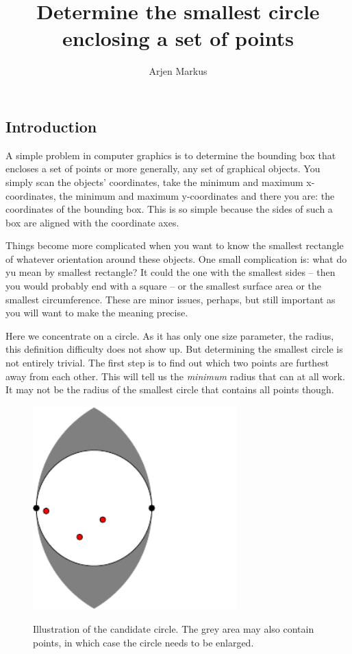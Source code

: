 \documentclass[onecolumn]{article}
\begin{document}
\title{Determine the smallest circle enclosing a set of points}

\author{Arjen Markus}

\maketitle


\subsection*{Introduction}

A simple problem in computer graphics is to determine the bounding box that encloses a set of points
or more generally, any set of graphical objects. You simply scan the objects' coordinates, take the minimum
and maximum x-coordinates, the minimum and maximum y-coordinates and there you are: the coordinates of the
bounding box. This is so simple because the sides of such a box are aligned with the coordinate axes.

Things become more complicated when you want to know the smallest rectangle of whatever orientation around
these objects. One small complication is: what do yu mean by smallest rectangle? It could the one with the
smallest sides -- then you would probably end with a square -- or the smallest surface area or the smallest
circumference. These are minor issues, perhaps, but still important as you will want to make the meaning precise.

Here we concentrate on a circle. As it has only one size parameter, the radius, this definition difficulty does
not show up. But determining the smallest circle is not entirely trivial. The first step is to find out which
two points are furthest away from each other. This will tell us the \emph{minimum} radius that can at all work.
It may not be the radius of the smallest circle that contains all points though.

\begin{figure}[h]
\begin{center}
\caption{Illustration of the candidate circle. The grey area may also contain points, in which case the
circle needs to be enlarged.}
\includegraphics[width=0.7\textwidth]{candidate_circle.pdf}
\label{candidate}
\end{center}
\end{figure}
\end{document}
